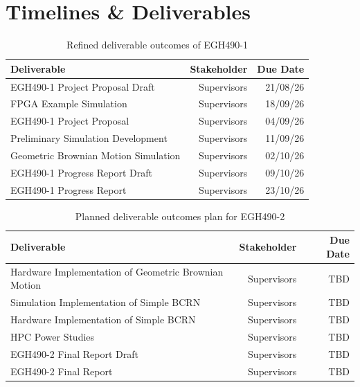 \documentclass[11pt, a4paper]{article}
\begin{document}
	\section{Timelines \& Deliverables}\label{apn:timeline}
	\begin{table}[h!]
		\caption{Refined deliverable outcomes of EGH490-1}
		\begin{tabularx}{\textwidth}{|X|r|r|}\hline
			Deliverable & Stakeholder & Due Date\\\hline
			EGH490-1 Project Proposal Draft & Supervisors & 21/08/26\\
			FPGA Example Simulation & Supervisors & 18/09/26\\
			EGH490-1 Project Proposal & Supervisors & 04/09/26\\
			Preliminary Simulation Development & Supervisors & 11/09/26\\
			Geometric Brownian Motion Simulation & Supervisors & 02/10/26\\
			EGH490-1 Progress Report Draft & Supervisors & 09/10/26\\
			EGH490-1 Progress Report & Supervisors & 23/10/26\\\hline
		\end{tabularx}	
		\label{tbl:sem1-deliverables}
	\end{table}
	
	\begin{table}[h!]
		\caption{Planned deliverable outcomes plan for EGH490-2}
		\begin{tabularx}{\textwidth}{|X|r|r|}\hline
			Deliverable & Stakeholder & Due Date\\\hline
			Hardware Implementation of Geometric Brownian Motion & Supervisors & TBD\\
			Simulation Implementation of Simple BCRN & Supervisors & TBD\\
			Hardware Implementation of Simple BCRN & Supervisors & TBD\\
			HPC Power Studies & Supervisors & TBD\\
			EGH490-2 Final Report Draft & Supervisors & TBD\\
			EGH490-2 Final Report & Supervisors & TBD\\\hline
		\end{tabularx}	
		\label{tbl:sem2-deliverables}
	\end{table}
	
	\newpage
\end{document}
